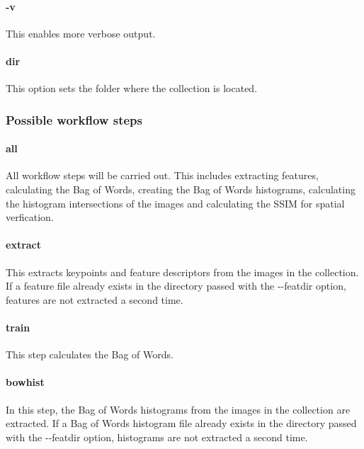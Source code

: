 \paragraph{\ttfamily-v}

This enables more verbose output.

\paragraph{\ttfamily dir}

This option sets the folder where the collection is located.

\subsubsection*{Possible workflow steps}

\paragraph{\ttfamily all}

All workflow steps will be carried out. This includes extracting features,
calculating the Bag of Words, creating the Bag of Words histograms, calculating 
the histogram intersections of the images and calculating the SSIM for spatial verfication.

\paragraph{\ttfamily extract}

This extracts keypoints and feature descriptors from the images in the collection.
If a feature file already exists in the directory passed with the {\ttfamily -{}-featdir} option,
features are not extracted a second time.

\paragraph{\ttfamily train}

This step calculates the Bag of Words.

\paragraph{\ttfamily bowhist}

In this step, the Bag of Words histograms from the images in the collection are extracted.
If a Bag of Words histogram file already exists in the directory passed with the {\ttfamily -{}-featdir} option,
histograms are not extracted a second time.

